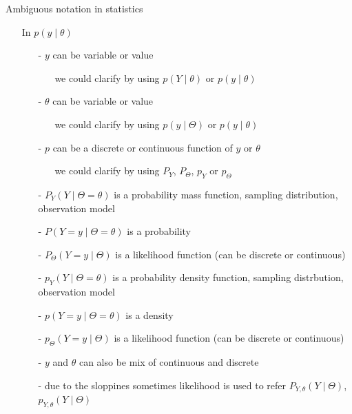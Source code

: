 \documentclass[english,t]{beamer}
\begin{document}
\begin{frame}{Ambiguous notation in statistics}
  
  \begin{itemize}
  \item[] In $p(y \mid \theta)$
    \pause
  \begin{itemize}
  \item[-] $y$ can be variable or value
    \begin{itemize}
    \item[] we could clarify by using $p(Y \mid \theta)$ or $p(y \mid \theta)$
    \end{itemize}
    \pause
  \item[-] $\theta$ can be variable or value
    \begin{itemize}
    \item[] we could clarify by using $p(y \mid \Theta)$ or $p(y \mid \theta)$
    \end{itemize}
    \pause
  \item[-] $p$ can be a discrete or continuous function of $y$ or $\theta$
    \begin{itemize}
    \item[] we could clarify by using $P_Y$, $P_\Theta$, $p_Y$ or $p_\Theta$
    \end{itemize}
    \pause
\item[-]
  $P_Y(Y \mid \Theta=\theta)$ is a probability mass function, sampling distribution, observation model
    \pause
\item[-]
$P(Y=y \mid \Theta=\theta)$ is a probability
    \pause
\item[-]
$P_\Theta(Y=y \mid \Theta)$ is a likelihood function (can be discrete or continuous)
    \pause
\item[-] $p_Y(Y \mid \Theta=\theta)$ is a probability density function, sampling distrbution, observation model
    \pause
\item[-] $p(Y=y \mid \Theta=\theta)$ is a density
    \pause
\item[-] $p_\Theta(Y=y \mid \Theta)$ is a likelihood function (can be discrete or continuous)
    \pause
  \item[-] $y$ and $\theta$ can also be mix of continuous and discrete
    \pause
    \item[-] due to the sloppines sometimes likelihood is used to refer
$P_{Y,\theta}(Y \mid \Theta)$, $p_{Y,\theta}(Y \mid \Theta)$

  \end{itemize}
\end{itemize}
\end{frame}
\end{document}
